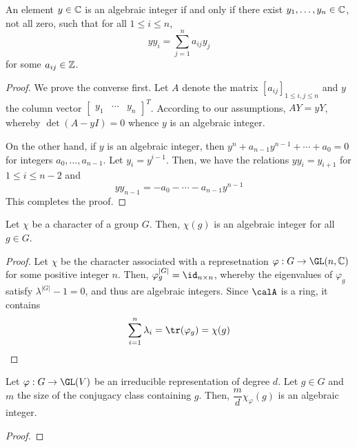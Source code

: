 \begin{lemma}
    An element $y\in\mathbb{C}$ is an algebraic integer if and only if there exist $y_1,\ldots,y_n\in\mathbb{C}$, not all zero, such that for all $1\le i\le n$,
    \begin{equation*}
        yy_i = \sum_{j = 1}^n a_{ij}y_j
    \end{equation*}
    for some $a_{ij}\in\mathbb{Z}$.
\end{lemma}
\begin{proof}
    We prove the converse first. Let $A$ denote the matrix $[a_{ij}]_{1\le i,j\le n}$ and $y$ the column vector $\begin{bmatrix}y_1 & \cdots & y_n\end{bmatrix}^T$. According to our assumptions, $AY = yY$, whereby $\det(A - yI) = 0$ whence $y$ is an algebraic integer.

   On the other hand, if $y$ is an algebraic integer, then $y^n + a_{n - 1}y^{n - 1} + \cdots + a_0 = 0$ for integers $a_0,\ldots,a_{n - 1}$. Let $y_i = y^{i - 1}$. Then, we have the relations $yy_i = y_{i + 1}$ for $1\le i\le n - 2$ and 
   \begin{equation*}
        yy_{n - 1} = -a_0 - \cdots - a_{n - 1}y^{n - 1}
   \end{equation*}
   This completes the proof.
\end{proof}

\begin{proposition}
    Let $\chi$ be a character of a group $G$. Then, $\chi(g)$ is an algebraic integer for all $g\in G$.
\end{proposition}
\begin{proof}
    Let $\chi$ be the character associated with a represetnation $\varphi: G\to\GL(n,\bbC)$ for some positive integer $n$. Then, $\varphi_g^{|G|} = \id_{n\times n}$, whereby the eigenvalues of $\varphi_g$ satisfy $\lambda^{|G|} - 1 = 0$, and thus are algebraic integers. Since $\calA$ is a ring, it contains 
    \begin{equation*}
        \sum_{i = 1}^n\lambda_i = \tr(\varphi_g) = \chi(g)
    \end{equation*}
\end{proof}

\begin{lemma}
    Let $\varphi: G\to\GL(V)$ be an irreducible representation of degree $d$. Let $g\in G$ and $m$ the size of the conjugacy class containing $g$. Then, $\dfrac{m}{d}\chi_\varphi(g)$ is an algebraic integer.
\end{lemma}
\begin{proof}
    
\end{proof}

